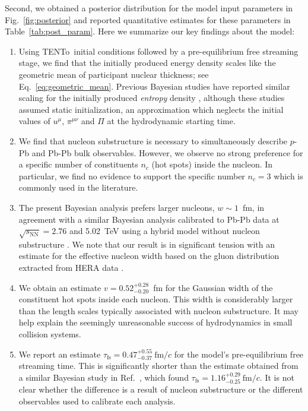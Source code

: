 \documentclass[aps,prc,reprint,amsmath,nofootinbib]{revtex4-1}
\newcommand{\trento}{T\raisebox{-0.5ex}{R}ENTo}
\newcommand{\sqrts}{\sqrt{s_\mathrm{NN}}}
\newcommand{\fmc}{\ensuremath{\text{fm}/c}}
\newcommand{\taufs}{\tau_\text{fs}}
\begin{document}
Second, we obtained a posterior distribution for the model input parameters in Fig.~\ref{fig:posterior} and reported quantitative estimates for these parameters in Table~\ref{tab:post_param}.
Here we summarize our key findings about the model:
\begin{enumerate}[itemsep=0pt, leftmargin=2\parindent]
  \item
    Using \trento\ initial conditions followed by a pre-equilibrium free streaming stage, we find that the initially produced energy density scales like the geometric mean of participant nuclear thickness; see Eq.~\eqref{eq:geometric_mean}.
    Previous Bayesian studies have reported similar scaling for the initially produced \emph{entropy} density \cite{Bernhard:2016tnd, Ke:2016jrd}, although these studies assumed static initialization, an approximation which neglects the initial values of $u^\mu$, $\pi^{\mu\nu}$ and $\Pi$ at the hydrodynamic starting time.
  \item
    We find that nucleon substructure is necessary to simultaneously describe $p$-Pb and Pb-Pb bulk observables.
    However, we observe no strong preference for a specific number of constituents $n_c$ (hot spots) inside the nucleon.
    In particular, we find no evidence to support the specific number $n_c=3$ which is commonly used in the literature.
  \item
    The present Bayesian analysis prefers larger nucleons, $w \sim 1$~fm, in agreement with a similar Bayesian analysis calibrated to Pb-Pb data at $\sqrts=2.76$ and 5.02~TeV using a hybrid model without nucleon substructure \cite{Bernhard:2018hnz}.
    We note that our result is in significant tension with an estimate for the effective nucleon width based on the gluon distribution extracted from HERA data \cite{Rezaeian:2012ji}.
  \item
    We obtain an estimate $v=0.52_{-0.20}^{+0.28}$~fm for the Gaussian width of the constituent hot spots inside each nucleon.
    This width is considerably larger than the length scales typically associated with nucleon substructure.
    It may help explain the seemingly unreasonable success of hydrodynamics in small collision systems.
  \item
    We report an estimate $\taufs=0.47_{-0.37}^{+0.55}~\fmc$ for the model's pre-equilibrium free streaming time.
    This is significantly shorter than the estimate obtained from a similar Bayesian study in Ref.~\cite{Bernhard:2018hnz}, which found $\taufs=1.16_{-0.25}^{+0.29}\ \fmc$.
    It is not clear whether the difference is a result of nucleon substructure or the different observables used to calibrate each analysis.

\end{enumerate}
\end{document}
